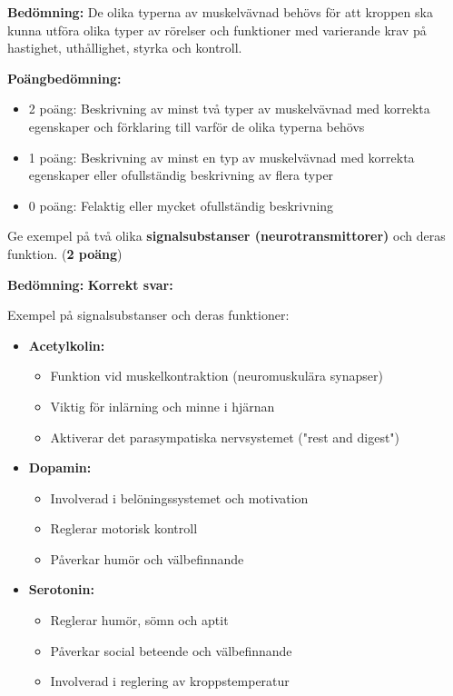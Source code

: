 \documentclass{exam}
\newenvironment{answer}
  {\begin{framed}\color{blue}\textbf{Bedömning:} }
  {\end{framed}}
\begin{document}
\begin{questions}
\begin{answer}
De olika typerna av muskelvävnad behövs för att kroppen ska kunna utföra olika typer av rörelser och funktioner med varierande krav på hastighet, uthållighet, styrka och kontroll.

\textbf{Poängbedömning:}
\begin{itemize}
  \item 2 poäng: Beskrivning av minst två typer av muskelvävnad med korrekta egenskaper och förklaring till varför de olika typerna behövs
  \item 1 poäng: Beskrivning av minst en typ av muskelvävnad med korrekta egenskaper eller ofullständig beskrivning av flera typer
  \item 0 poäng: Felaktig eller mycket ofullständig beskrivning
\end{itemize}
\end{answer}
\vspace{5mm}

\question Ge exempel på två olika \textbf{signalsubstanser (neurotransmittorer)} och deras funktion. (\textbf{2 poäng})
\vspace{5mm}

\begin{answer}
\textbf{Korrekt svar:}

Exempel på signalsubstanser och deras funktioner:
\begin{itemize}
  \item \textbf{Acetylkolin:} 
  \begin{itemize}
    \item Funktion vid muskelkontraktion (neuromuskulära synapser)
    \item Viktig för inlärning och minne i hjärnan
    \item Aktiverar det parasympatiska nervsystemet ("rest and digest")
  \end{itemize}
  
  \item \textbf{Dopamin:}
  \begin{itemize}
    \item Involverad i belöningssystemet och motivation
    \item Reglerar motorisk kontroll
    \item Påverkar humör och välbefinnande
  \end{itemize}
  
  \item \textbf{Serotonin:}
  \begin{itemize}
    \item Reglerar humör, sömn och aptit
    \item Påverkar social beteende och välbefinnande
    \item Involverad i reglering av kroppstemperatur
  \end{itemize}
  

\end{itemize}
\end{answer}
\end{questions}
\end{document}
